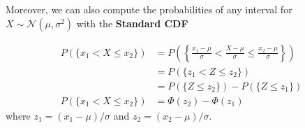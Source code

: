\documentclass[smaller]{beamer}\usepackage[]{graphicx}\usepackage[]{color}
\renewcommand{\Pr}{P}
\newcommand{\N}{\mathcal{N}}
\begin{document}
\begin{frame}{\secname}
Moreover, we can also compute the probabilities of any interval for $X\sim \N\left( \mu ,\sigma ^{2}\right)$ with the \textbf{Standard CDF}

\begin{align*}
  \Pr(\{x_1<X\leq x_2\}) &=
  \Pr\left(\left\{\frac{x_1-\mu}{\sigma}<\frac{X-\mu}{\sigma}\leq \frac{x_2-\mu}{\sigma}\right\}\right) \\
  &= \Pr(\{z_1<Z\leq z_2\})\\
  &= \Pr(\{Z\leq z_2\}) - \Pr(\{Z\leq z_1\})\\
  \Pr(\{x_1<X\leq x_2\}) &= \Phi(z_2)-\Phi(z_1)
\end{align*}
where $z_1=(x_1-\mu)/\sigma$ and $z_2=(x_2-\mu)/\sigma$.
\end{frame}
\end{document}
